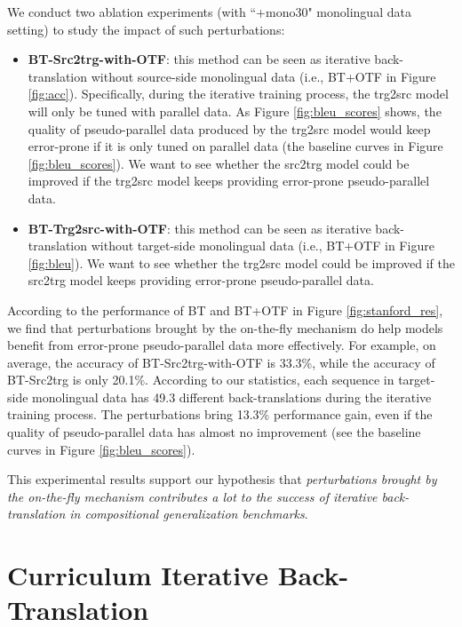 \documentclass[letterpaper]{article} %
\begin{document}
We conduct two ablation experiments (with ``+mono30" monolingual data setting) to study the impact of such perturbations:

\begin{itemize}
\item \textbf{BT-Src2trg-with-OTF}:
this method can be seen as iterative back-translation without source-side monolingual data (i.e., BT+OTF in Figure \ref{fig:acc}).
Specifically, during the iterative training process, the trg2src model will only be tuned with parallel data.
As Figure \ref{fig:bleu_scores} shows, the quality of pseudo-parallel data produced by the trg2src model would keep error-prone if it is only tuned on parallel data (the baseline curves in Figure \ref{fig:bleu_scores}).
We want to see whether the src2trg model could be improved if the trg2src model keeps providing error-prone pseudo-parallel data.
\item \textbf{BT-Trg2src-with-OTF}:
this method can be seen as iterative back-translation without target-side monolingual data (i.e., BT+OTF in Figure \ref{fig:bleu}).
We want to see whether the trg2src model could be improved if the src2trg model keeps providing error-prone pseudo-parallel data.
\end{itemize}





According to the performance of BT and BT+OTF in Figure \ref{fig:stanford_res}, we find that perturbations brought by the on-the-fly mechanism do help models benefit from error-prone pseudo-parallel data more effectively.
For example, on average, the accuracy of BT-Src2trg-with-OTF is 33.3\%, while the accuracy of BT-Src2trg is only 20.1\%.
According to our statistics, each sequence in target-side monolingual data has 49.3 different back-translations during the iterative training process.
The perturbations bring 13.3\% performance gain, even if the quality of pseudo-parallel data has almost no improvement (see the baseline curves in Figure \ref{fig:bleu_scores}).

This experimental results support our hypothesis that \emph{perturbations brought by the on-the-fly mechanism contributes a lot to the success of iterative back-translation in compositional generalization benchmarks}.

\section{Curriculum Iterative Back-Translation}
\label{section:c3}
\end{document}
